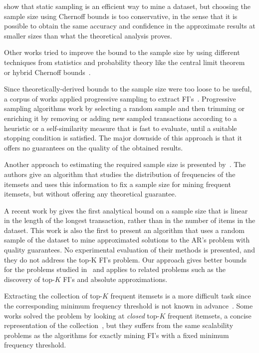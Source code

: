 \citet{ZakiPLO97} show that static sampling is an efficient way to
mine a dataset, but choosing the sample size using Chernoff bounds is too
conservative, in the sense that it is possible to obtain the same accuracy and
confidence in the approximate results at smaller sizes than what the theoretical
analysis proves. 

Other works tried to improve the bound to the sample size by using different
techniques from statistics and probability theory like the central limit
theorem~\cite{ZhangZW03,LiG04,JiaL05} or hybrid Chernoff
bounds~\cite{ZhaoZZ06}.

Since theoretically-derived bounds to the sample size were too loose to be
useful, a corpus of works applied progressive sampling to extract
FI's~\cite{JohnL96,ChenHS02,Parthasarathy02,BronnimanCDHS03,ChuangCY05,JiaG05,WangDC05,HwangK06,HuY06,MahafzahABAZ09,ChenHH11,ChandraB11}.
Progressive sampling algorithms work by selecting a random sample and then
trimming or enriching it by removing or adding new sampled transactions
according to a heuristic or a self-similarity measure that is fast to evaluate,
until a suitable stopping condition is satisfied. The major downside of this
approach is that it offers no guarantees on the quality of the obtained results.

Another approach to estimating the required sample size is presented
by~\citet{ChuangHC08}. The authors give an algorithm that studies the
distribution of frequencies of the itemsets and uses this information to fix a
sample size for mining frequent itemsets, but without offering any theoretical
guarantee.

A recent work by \citet{ChakaravarthyPS09} gives the first
analytical bound on a sample size that is linear in the length of the longest
transaction, rather than in the number of items in the dataset.  This work is
also the first to present an algorithm that uses a random sample of the dataset
to mine approximated solutions to the AR's problem with quality guarantees. No
experimental evaluation of their methods is presented, and they do not address
the top-K FI's problem. Our approach gives better bounds for the problems
studied in~\cite{ChakaravarthyPS09} and applies to related problems such as the
discovery of top-$K$ FI's and absolute approximations.

Extracting the collection of top-$K$ frequent itemsets is a more difficult task
since the corresponding minimum frequency threshold is not known in
advance~\cite{CheungF04,FuKT00}. Some works solved the problem by looking at
\emph{closed} top-$K$ frequent itemsets, a concise representation of the
collection~\cite{WangHLT05,PietracaprinaV07}, but they suffers from the same
scalability problems as the algorithms for exactly mining FI's with a fixed
minimum frequency threshold.


